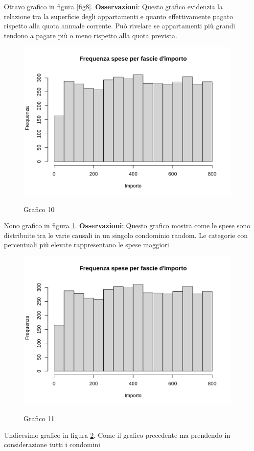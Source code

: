 Ottavo grafico in figura \ref{fig8}. \textbf{Osservazioni}: Questo grafico evidenzia la relazione tra la superficie degli appartamenti e quanto effettivamente pagato rispetto alla quota annuale corrente. Può rivelare se appartamenti più grandi tendono a pagare più o meno rispetto alla quota prevista.

\clearpage

\begin{figure}[t]
	\caption{Grafico 10}
	\includegraphics[page=10,width=\textwidth]{../R/grafici.pdf}
	\label{fig10}
\end{figure}

Nono grafico in figura \ref{fig10}. \textbf{Osservazioni}: Questo grafico mostra come le spese sono distribuite tra le varie causali in un singolo condominio random. Le categorie con percentuali più elevate rappresentano le spese maggiori


\clearpage

\begin{figure}[t]
	\caption{Grafico 11}
	\includegraphics[page=11,width=\textwidth]{../R/grafici.pdf}
	\label{fig11}
\end{figure}

Undicesimo grafico in figura \ref{fig11}. Come il grafico precedente ma prendendo in considerazione tutti i condomini

